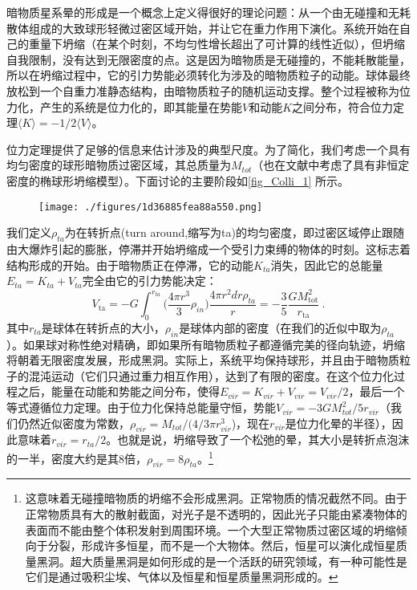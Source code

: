 
暗物质星系晕的形成是一个概念上定义得很好的理论问题：从一个由无碰撞和无耗散体组成的大致球形轻微过密区域开始，并让它在重力作用下演化。系统开始在自己的重量下坍缩（在某个时刻，不均匀性增长超出了可计算的线性近似），但坍缩自我限制，没有达到无限密度的点。这是因为暗物质是无碰撞的，不能耗散能量，所以在坍缩过程中，它的引力势能必须转化为涉及的暗物质粒子的动能。球体最终放松到一个自重力准静态结构，由暗物质粒子的随机运动支撑。整个过程被称为位力化，产生的系统是位力化的，即其能量在势能$V$和动能$K$之间分布，符合位力定理$\langle K\rangle  = -1/2 \langle V\rangle $。

位力定理提供了足够的信息来估计涉及的典型尺度。为了简化，我们考虑一个具有均匀密度的球形暗物质过密区域，其总质量为$M_{tot}$（也在文献中考虑了具有非恒定密度的椭球形坍缩模型）。下面讨论的主要阶段如\autoref{fig_Colli_1} 所示。
\begin{figure}[ht]
\centering
\texttt{[image: ./figures/1d36885fea88a550.png]}
\caption{} \label{fig_Colli_1}
\end{figure}

我们定义$\rho_{ta}$为在转折点(turn around,缩写为ta)的均匀密度，即过密区域停止跟随由大爆炸引起的膨胀，停滞并开始坍缩成一个受引力束缚的物体的时刻。这标志着结构形成的开始。由于暗物质正在停滞，它的动能$K_{ta}$消失，因此它的总能量$E_{ta} = K_{ta} + V_{ta}$完全由它的引力势能决定：
\begin{equation}
V_{\text{ta}} = - G \int_0^{r_{ta}} \bigg( \frac{4\pi r^3}{3} \rho_{in} \bigg) \frac{4\pi r^2 dr \rho_{ta}}{r} = -\frac{3}{5} \frac{G M_{\text{tot}}^2}{r_{\text{ta}}} ~.
\end{equation}
其中$r_{ta}$是球体在转折点的大小，$\rho_{in}$是球体内部的密度（在我们的近似中取为$\rho_{ta}$）。如果球对称性绝对精确，即如果所有暗物质粒子都遵循完美的径向轨迹，坍缩将朝着无限密度发展，形成黑洞。实际上，系统平均保持球形，并且由于暗物质粒子的混沌运动（它们只通过重力相互作用），达到了有限的密度。在这个位力化过程之后，能量在动能和势能之间分布，使得$E_{vir} = K_{vir} + V_{vir} = V_{vir}/2$，最后一个等式遵循位力定理。由于位力化保持总能量守恒，势能$V_{vir} = -3GM^2_{tot}/5r_{vir}$（我们仍然近似密度为常数，$\rho_{vir} = M_{tot}/(4/3\pi r^3_{vir}$)，现在$r_{vir}$是位力化晕的半径），因此意味着$r_{vir} = r_{ta}/2$。也就是说，坍缩导致了一个松弛的晕，其大小是转折点泡沫的一半，密度大约是其8倍，$\rho_{vir} = 8\rho_{ta}$。\footnote{这意味着无碰撞暗物质的坍缩不会形成黑洞。正常物质的情况截然不同。由于正常物质具有大的散射截面，对光子是不透明的，因此光子只能由紧凑物体的表面而不能由整个体积发射到周围环境。一个大型正常物质过密区域的坍缩倾向于分裂，形成许多恒星，而不是一个大物体。然后，恒星可以演化成恒星质量黑洞。超大质量黑洞是如何形成的是一个活跃的研究领域，有一种可能性是它们是通过吸积尘埃、气体以及恒星和恒星质量黑洞形成的。}

